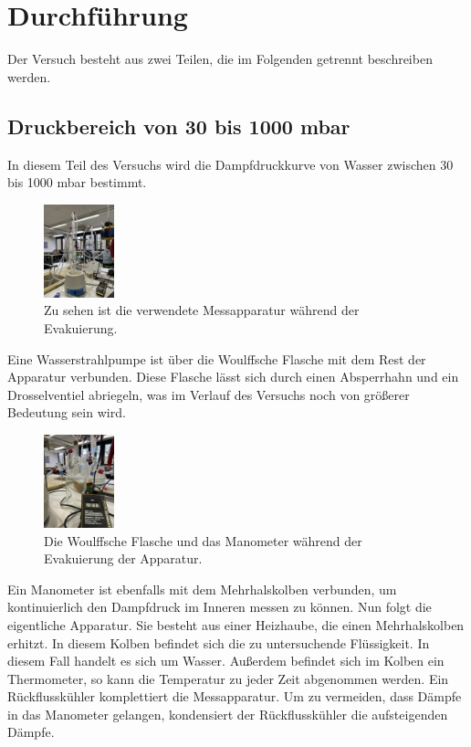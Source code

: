 \section{Durchführung}
\label{sec:Durchführung}

Der Versuch besteht aus zwei Teilen, die im Folgenden getrennt beschreiben werden.
\subsection{Druckbereich von 30 bis 1000 mbar}
In diesem Teil des Versuchs wird die Dampfdruckkurve von Wasser zwischen 30 bis 1000 mbar bestimmt.
\begin{figure}[H]
    \centering
    \includegraphics[height=2.7cm, angle=270]{content/Verwendete_Messapparatur.jpeg}
    \caption{Zu sehen ist die verwendete Messapparatur während der Evakuierung.}
    \label{Abb:Messapparatur}
\end{figure}
Eine Wasserstrahlpumpe ist über die Woulffsche Flasche mit dem Rest der Apparatur verbunden.
Diese Flasche lässt sich durch einen Absperrhahn und ein Drosselventiel abriegeln, was im Verlauf des Versuchs noch von größerer Bedeutung sein wird.\\
\begin{figure}[H]
    \centering
    \includegraphics[height=2.7cm, angle=270]{content/Woulffsche_Flasche.jpeg}
    \caption{Die Woulffsche Flasche und das Manometer während der Evakuierung der Apparatur.}
    \label{Abb:Woulffsche_Flasche}
\end{figure}
Ein Manometer ist ebenfalls mit dem Mehrhalskolben verbunden, um kontinuierlich den Dampfdruck im Inneren messen zu können.
Nun folgt die eigentliche Apparatur.
Sie besteht aus einer Heizhaube, die einen Mehrhalskolben erhitzt.
In diesem Kolben befindet sich die zu untersuchende Flüssigkeit.
In diesem Fall handelt es sich um Wasser.
Außerdem befindet sich im Kolben ein Thermometer, so kann die Temperatur zu jeder Zeit abgenommen werden.
Ein Rückflusskühler komplettiert die Messapparatur.
Um zu vermeiden, dass Dämpfe in das Manometer gelangen, kondensiert der Rückflusskühler die aufsteigenden Dämpfe.\\

